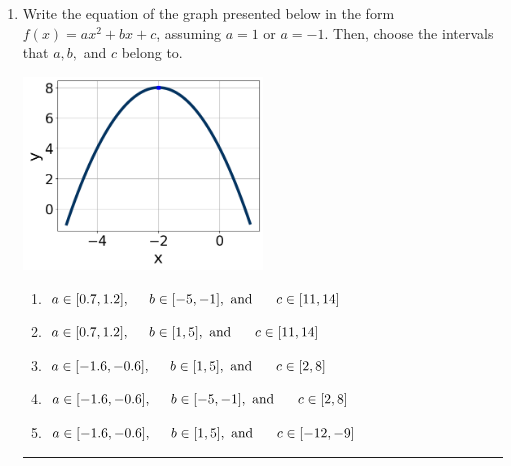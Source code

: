 \documentclass[14pt]{extbook}
\newcommand{\litem}[1]{\item#1\hspace*{-1cm}\rule{\textwidth}{0.4pt}}
\begin{document}
\begin{enumerate}
{\begin{enumerate}[label=\Alph*.]
\end{enumerate} }
\litem{
Write the equation of the graph presented below in the form $f(x)=ax^2+bx+c$, assuming  $a=1$ or $a=-1$. Then, choose the intervals that $a, b,$ and $c$ belong to.
\begin{center}
    \includegraphics[width=0.5\textwidth]{../Figures/quadraticGraphToEquationCopyB.png}
\end{center}
\begin{enumerate}[label=\Alph*.]
\item \( a \in [0.7, 1.2], \hspace*{5mm} b \in [-5, -1], \text{ and } \hspace*{5mm} c \in [11, 14] \)
\item \( a \in [0.7, 1.2], \hspace*{5mm} b \in [1, 5], \text{ and } \hspace*{5mm} c \in [11, 14] \)
\item \( a \in [-1.6, -0.6], \hspace*{5mm} b \in [1, 5], \text{ and } \hspace*{5mm} c \in [2, 8] \)
\item \( a \in [-1.6, -0.6], \hspace*{5mm} b \in [-5, -1], \text{ and } \hspace*{5mm} c \in [2, 8] \)
\item \( a \in [-1.6, -0.6], \hspace*{5mm} b \in [1, 5], \text{ and } \hspace*{5mm} c \in [-12, -9] \)


\end{enumerate}}
\end{enumerate}
\end{document}
